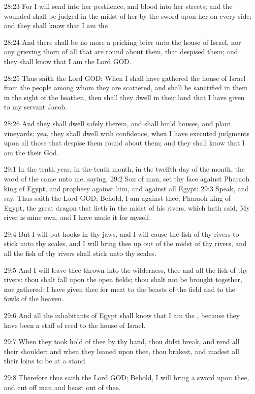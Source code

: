 28:23 For I will send into her pestilence, and blood into her streets;
and the wounded shall be judged in the midst of her by the sword upon
her on every side; and they shall know that I am the \LORD.

28:24 And there shall be no more a pricking brier unto the house of
Israel, nor any grieving thorn of all that are round about them, that
despised them; and they shall know that I am the Lord GOD.

28:25 Thus saith the Lord GOD; When I shall have gathered the house of
Israel from the people among whom they are scattered, and shall be
sanctified in them in the sight of the heathen, then shall they dwell
in their land that I have given to my servant Jacob.

28:26 And they shall dwell safely therein, and shall build houses, and
plant vineyards; yea, they shall dwell with confidence, when I have
executed judgments upon all those that despise them round about them;
and they shall know that I am the \LORD their God.

29:1 In the tenth year, in the tenth month, in the twelfth day of the
month, the word of the \LORD came unto me, saying, 29:2 Son of man, set
thy face against Pharaoh king of Egypt, and prophesy against him, and
against all Egypt: 29:3 Speak, and say, Thus saith the Lord GOD;
Behold, I am against thee, Pharaoh king of Egypt, the great dragon
that lieth in the midst of his rivers, which hath said, My river is
mine own, and I have made it for myself.

29:4 But I will put hooks in thy jaws, and I will cause the fish of
thy rivers to stick unto thy scales, and I will bring thee up out of
the midst of thy rivers, and all the fish of thy rivers shall stick
unto thy scales.

29:5 And I will leave thee thrown into the wilderness, thee and all
the fish of thy rivers: thou shalt fall upon the open fields; thou
shalt not be brought together, nor gathered: I have given thee for
meat to the beasts of the field and to the fowls of the heaven.

29:6 And all the inhabitants of Egypt shall know that I am the \LORD,
because they have been a staff of reed to the house of Israel.

29:7 When they took hold of thee by thy hand, thou didst break, and
rend all their shoulder: and when they leaned upon thee, thou brakest,
and madest all their loins to be at a stand.

29:8 Therefore thus saith the Lord GOD; Behold, I will bring a sword
upon thee, and cut off man and beast out of thee.

